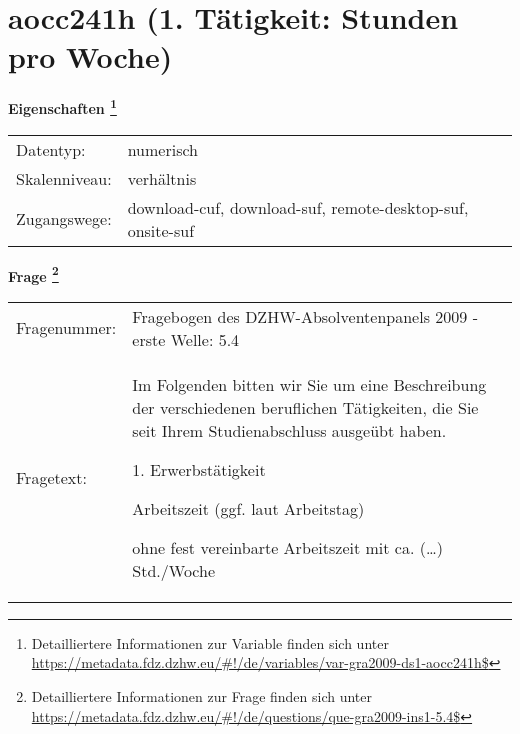 
    \setcounter{footnote}{0}

    \vspace*{-1.8cm}
	\section{aocc241h (1. Tätigkeit: Stunden pro Woche)}
	\label{section:aocc241h}



    \vspace*{0.5cm}
    \noindent\textbf{Eigenschaften
	\footnote{Detailliertere Informationen zur Variable finden sich unter
		\url{https://metadata.fdz.dzhw.eu/\#!/de/variables/var-gra2009-ds1-aocc241h$}}}\\
	\begin{tabularx}{\hsize}{@{}lX}
	Datentyp: & numerisch \\
	Skalenniveau: & verhältnis \\
	Zugangswege: &
	  download-cuf, 
	  download-suf, 
	  remote-desktop-suf, 
	  onsite-suf
 \\
    \end{tabularx}



				\vspace*{0.5cm}
                \noindent\textbf{Frage
	                \footnote{Detailliertere Informationen zur Frage finden sich unter
		              \url{https://metadata.fdz.dzhw.eu/\#!/de/questions/que-gra2009-ins1-5.4$}}}\\
				\begin{tabularx}{\hsize}{@{}lX}
					Fragenummer: &
					  Fragebogen des DZHW-Absolventenpanels 2009 - erste Welle:
					  5.4
 \\
					Fragetext: & Im Folgenden bitten wir Sie um eine Beschreibung der verschiedenen beruflichen Tätigkeiten, die Sie seit Ihrem Studienabschluss ausgeübt haben.\par  1. Erwerbstätigkeit\par  Arbeitszeit (ggf. laut Arbeitstag)\par  ohne fest vereinbarte Arbeitszeit mit ca. (…) Std./Woche \\
				\end{tabularx}





